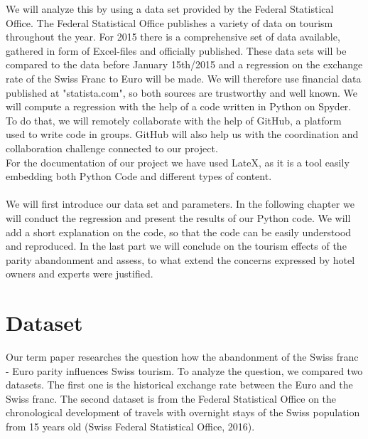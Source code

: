 \documentclass[12pt,a4paper,bibliography=totocnumbered,listof=totocnumbered]{scrartcl}
\begin{document}
We will analyze this by using a data set provided by the Federal Statistical Office. The Federal Statistical Office publishes a variety of data on tourism throughout the year. For 2015 there is a comprehensive set of data available, gathered in form of Excel-files and officially published. These data sets will be compared to the data before January 15th/2015 and a regression on the exchange rate of the Swiss Franc to Euro will be made. We will therefore use financial data published at "statista.com", so both sources are trustworthy and well known. We will compute a regression with the help of a code written in Python on Spyder. To do that, we will remotely collaborate with the help of GitHub, a platform used to write code in groups. GitHub will also help us with the coordination and collaboration challenge connected to our project.\\
For the documentation of our project we have used LateX, as it is a tool easily embedding both Python Code and different types of content. \\
\\
We will first introduce our data set and parameters. In the following chapter we will conduct the regression and present the results of our Python code. We will add a short explanation on the code, so that the code can be easily understood and reproduced. In the last part we will conclude on the tourism effects of the parity abandonment and assess, to what extend the concerns expressed by hotel owners and experts were justified. 


\newpage


% 
\section{Dataset}



Our term paper researches the question how the abandonment of the Swiss franc - Euro parity influences Swiss tourism. To analyze the question, we compared two datasets. The first one is the historical exchange rate between the Euro and the Swiss franc. The second dataset is from the Federal Statistical Office on the chronological development of travels with overnight stays of the Swiss population from 15 years old (Swiss Federal Statistical Office, 2016). 
\end{document}
